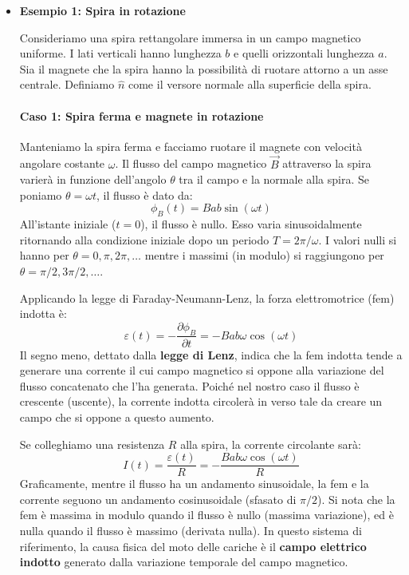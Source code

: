 \documentclass{book}
\begin{document}
\begin{itemize}
\item \hypertarget{Es1}{\textbf{Esempio 1: Spira in rotazione }}
Consideriamo una spira rettangolare immersa in un campo magnetico uniforme. I lati verticali hanno lunghezza $b$ e quelli orizzontali lunghezza $a$. Sia il magnete che la spira hanno la possibilità di ruotare attorno a un asse centrale. Definiamo $\hat{n}$ come il versore normale alla superficie della spira.

\paragraph{Caso 1: Spira ferma e magnete in rotazione}
Manteniamo la spira ferma e facciamo ruotare il magnete con velocità angolare costante $\omega$. Il flusso del campo magnetico $\vec{B}$ attraverso la spira varierà in funzione dell'angolo $\theta$ tra il campo e la normale alla spira. Se poniamo $\theta = \omega t$, il flusso è dato da:
$$
\phi_B(t) = B a b \sin(\omega t)
$$
All'istante iniziale ($t=0$), il flusso è nullo. Esso varia sinusoidalmente ritornando alla condizione iniziale dopo un periodo $T=2\pi/\omega$. I valori nulli si hanno per $\theta=0, \pi, 2\pi, \dots$ mentre i massimi (in modulo) si raggiungono per $\theta=\pi/2, 3\pi/2, \dots$.

Applicando la legge di Faraday-Neumann-Lenz, la forza elettromotrice (fem) indotta è:
$$\varepsilon(t) = -\frac{\partial \phi_B}{\partial t} = - B a b \omega \cos(\omega t)$$
Il segno meno, dettato dalla \textbf{legge di Lenz}, indica che la fem indotta tende a generare una corrente il cui campo magnetico si oppone alla variazione del flusso concatenato che l'ha generata. Poiché nel nostro caso il flusso è crescente (uscente), la corrente indotta circolerà in verso tale da creare un campo che si oppone a questo aumento.

Se colleghiamo una resistenza $R$ alla spira, la corrente circolante sarà:
$$I(t) = \frac{\varepsilon(t)}{R} = -\frac{B a b \omega \cos(\omega t)}{R}$$
Graficamente, mentre il flusso ha un andamento sinusoidale, la fem e la corrente seguono un andamento cosinusoidale (sfasato di $\pi/2$). Si nota che la fem è massima in modulo quando il flusso è nullo (massima variazione), ed è nulla quando il flusso è massimo (derivata nulla).
In questo sistema di riferimento, la causa fisica del moto delle cariche è il \textbf{campo elettrico indotto} generato dalla variazione temporale del campo magnetico.


\end{itemize}
\end{document}
